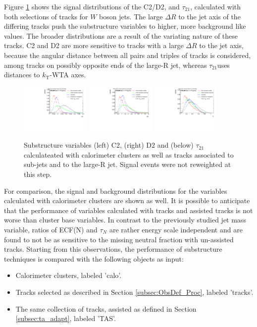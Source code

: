 Figure \ref{fig:selection} shows the signal distributions of the C2/D2, and $\tau_{21}$, calculated with both selections of tracks for $W$ boson jets. The large $\Delta R$ to the jet axis of the differing tracks push the substructure variables to higher, more background like values. The broader distributions are a result of the variating nature of these tracks. C2 and D2 are more sensitive to tracks with a large $\Delta R$ to the jet axis, because the angular distance between all pairs and triples of tracks is considered, among tracks on possibly opposite ends of the large-R jet, whereas $\tau_{21}$uses distances to $k_\mathrm{T}$-WTA axes.
\begin{figure}
	\centering
	\includegraphics[width=0.3\textwidth]{sascha_input/plots/track_selection/h_ghost_sj_C2.pdf} 
	\includegraphics[width=0.3\textwidth]{sascha_input/plots/track_selection/h_ghost_sj_D2.pdf}
	\includegraphics[width=0.3\textwidth]{sascha_input/plots/track_selection/h_ghost_sj_nSub21.pdf}
\caption{\footnotesize{Substructure variables (left) C2, (right) D2 and (below) $\tau_{21}$ calculateated with calorimeter clusters as well as tracks associated to sub-jets and to the large-R jet. Signal events were not reweighted at this step.}}\label{fig:selection}
\end{figure}
For comparison, the signal and background distributions for the variables calculated with calorimeter clusters are shown as well. It is possible to anticipate that the performance of variables calculated with tracks and assisted tracks is not worse than cluster base variables.
In contrast to the previously studied jet mass variable, ratios of ECF(N) and $\tau_N$ are rather energy scale independent and are found to not be as sensitive to the missing neutral fraction with un-assisted tracks.
Starting from this observations, the performance of substructure techniques is compared with the following objects as input:
\begin{itemize}
\item Calorimeter clusters, labeled 'calo'.
\item Tracks selected as described in Section \ref{subsec:ObsDef_Proc}, labeled 'tracks'.
\item The same collection of tracks, assisted as defined in Section \ref{subsec:ta_adapt}, labeled 'TAS'.
\end{itemize}